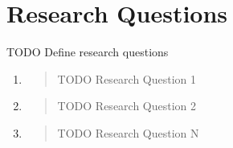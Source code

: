 \section{Research Questions}

TODO Define research questions

\begin{enumerate}
    \item \begin{quote}
        TODO Research Question 1
    \end{quote}
    \item \begin{quote}
        TODO Research Question 2
    \end{quote}
    \item \begin{quote}
        TODO Research Question N
    \end{quote}
\end{enumerate}